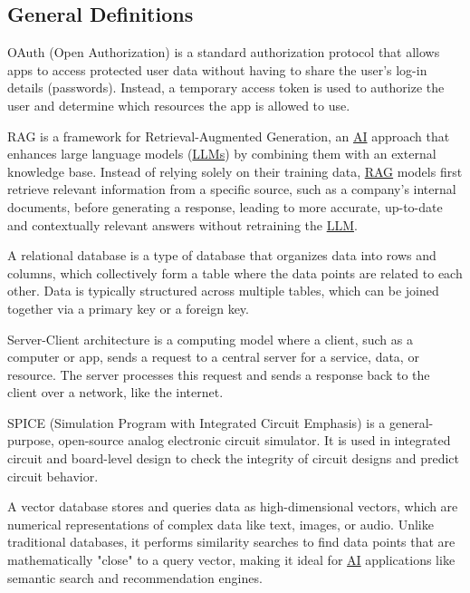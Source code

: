 \subsection{General Definitions}
\begin{description}[style=nextline, labelwidth=0pt, labelsep=0pt, leftmargin=0pt]
  \item[\textbf{\textit{OAuth}}] \label{def:oauth}
  OAuth (Open Authorization) is a standard authorization protocol that allows apps to access protected user data without having to share the user's log-in details (passwords). Instead, a temporary access token is used to authorize the user and determine which resources the app is allowed to use.

  \item[\textbf{\textit{RAG}}] \label{def:rag}
RAG is a framework for Retrieval-Augmented Generation, an \hyperref[abr:AI]{AI} approach that enhances large language models (\hyperref[abr:LLM]{LLMs}) by combining them with an external knowledge base. Instead of relying solely on their training data, \hyperref[abr:RAG]{RAG} models first retrieve relevant information from a specific source, such as a company's internal documents, before generating a response, leading to more accurate, up-to-date and contextually relevant answers without retraining the \hyperref[abr:LLM]{LLM}.
  
  \item[\textbf{\textit{Relational Database}}] \label{def:relational-database}
  A relational database is a type of database that organizes data into rows and columns, which collectively form a table where the data points are related to each other. Data is typically structured across multiple tables, which can be joined together via a primary key or a foreign key.

  \item[\textbf{\textit{Server-Client}}] \label{def:server-client}
  Server-Client architecture is a computing model where a client, such as a computer or app, sends a request to a central server for a service, data, or resource. The server processes this request and sends a response back to the client over a network, like the internet.

  \item[\textbf{\textit{SPICE}}] \label{def:spice}
  SPICE (Simulation Program with Integrated Circuit Emphasis) is a general-purpose, open-source analog electronic circuit simulator. It is used in integrated circuit and board-level design to check the integrity of circuit designs and predict circuit behavior.

  \item[\textbf{\textit{Vector Database}}] \label{def:vector-database}
  A vector database stores and queries data as high-dimensional vectors, which are numerical representations of complex data like text, images, or audio. Unlike traditional databases, it performs similarity searches to find data points that are mathematically "close" to a query vector, making it ideal for \hyperref[abr:AI]{AI} applications like semantic search and recommendation engines.
  
\end{description}
